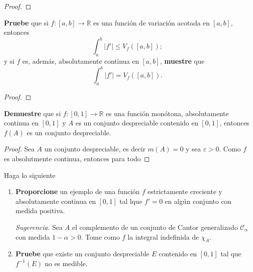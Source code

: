 \documentclass[12pt]{report}
\theoremstyle{largebreak}
\newcommand\abs[1]{\ensuremath{\lvert#1\rvert}}
\newcommand\cf[3]{\ensuremath{#1:#2\rightarrow#3}}
\begin{document}
    \begin{proof}
        
    \end{proof}

    \begin{excer}
        \textbf{Pruebe} que si $\cf{f}{[a,b]}{\mathbb{R}}$ es una función de variación acotada en $[a,b]$, entonces
        \begin{equation*}
            \int_{a}^{b}\abs{f'}\leq V_f([a,b]);
        \end{equation*}
        y si $f$ es, además, absolutamente continua en $[a,b]$, \textbf{muestre} que
        \begin{equation*}
            \int_{a}^{b}\abs{f'}=V_f([a,b]).
        \end{equation*}
    \end{excer}

    \begin{proof}
        
    \end{proof}

    \begin{excer}
        \textbf{Demuestre} que si $\cf{f}{[0,1]}{\mathbb{R}}$ es una función monótona, absolutamente continua en $[0,1]$ y $A$ es un conjunto despreciable contenido en $[0,1]$, entonces $f(A)$ es un conjunto despreciable.
    \end{excer}

    \begin{proof}
        Sea $A$ un conjunto despreciable, es decir $m\left(A\right)=0$ y sea $\varepsilon>0$. Como $f$ es absolutmente continua, entonces para todo
    \end{proof}

    \begin{excer}
        Haga lo siguiente
        \begin{enumerate}
            \item \textbf{Proporcione} un ejemplo de una función $f$ estrictamente creciente y absolutamente continua en $[0,1]$ tal lque $f'=0$ en algún conjunto con medida positiva.
            
            \textit{Sugerencia.} Sea $A$ el complemento de un conjunto de Cantor generalizado $\mathscr{C}_\alpha$ con medida $1-\alpha>0$. Tome como $f$ la integral indefinida de $\chi_A$.
            \item \textbf{Pruebe} que existe un conjunto despreciable $E$ contenido en $[0,1]$ tal que $f^{-1}(E)$ no es medible.
        \end{enumerate}
    \end{excer}
\end{document}
